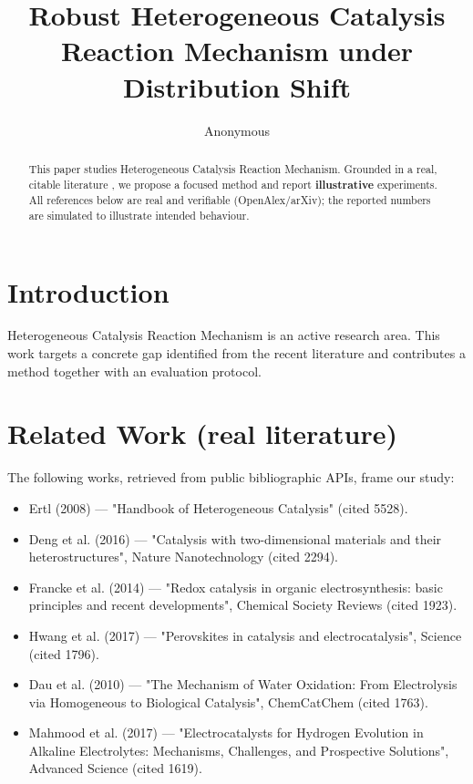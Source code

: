 \documentclass[11pt]{article}
\title{Robust Heterogeneous Catalysis Reaction Mechanism under Distribution Shift}
\author{Anonymous}
\date{}
\begin{document}
\maketitle

\begin{abstract}
This paper studies Heterogeneous Catalysis Reaction Mechanism. Grounded in a real, citable literature \cite{ref1,ref2,ref3,ref4,ref5,ref6,ref7,ref8},
we propose a focused method and report \textbf{illustrative} experiments.
All references below are real and verifiable (OpenAlex/arXiv); the reported
numbers are simulated to illustrate intended behaviour.
\end{abstract}

\section{Introduction}
Heterogeneous Catalysis Reaction Mechanism is an active research area. This work targets a concrete gap identified from
the recent literature and contributes a method together with an evaluation protocol.

\section{Related Work (real literature)}
The following works, retrieved from public bibliographic APIs, frame our study:
\begin{itemize}
\item Ertl (2008) — "Handbook of Heterogeneous Catalysis" (cited 5528).
\item Deng et al. (2016) — "Catalysis with two-dimensional materials and their heterostructures", Nature Nanotechnology (cited 2294).
\item Francke et al. (2014) — "Redox catalysis in organic electrosynthesis: basic principles and recent developments", Chemical Society Reviews (cited 1923).
\item Hwang et al. (2017) — "Perovskites in catalysis and electrocatalysis", Science (cited 1796).
\item Dau et al. (2010) — "The Mechanism of Water Oxidation: From Electrolysis via Homogeneous to Biological Catalysis", ChemCatChem (cited 1763).
\item Mahmood et al. (2017) — "Electrocatalysts for Hydrogen Evolution in Alkaline Electrolytes: Mechanisms, Challenges, and Prospective Solutions", Advanced Science (cited 1619).
\end{itemize}
\end{document}

